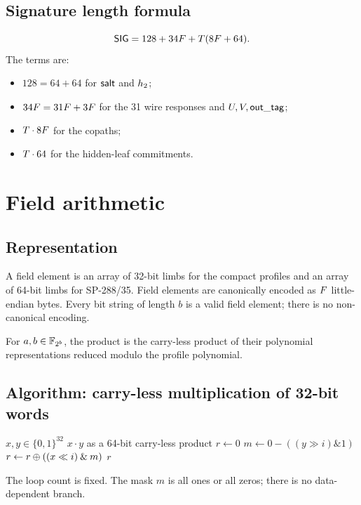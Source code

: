\documentclass[11pt,a4paper]{article}
\begin{document}
\subsection{Signature length formula}

\begin{equation}
\mathsf{SIG}=128+34F+T(8F+64).
\label{eq:siglen}
\end{equation}
The terms are:
\begin{itemize}
  \item $128=64+64$ for $\mathsf{salt}$ and $h_2$;
  \item $34F=31F+3F$ for the 31 wire responses and
        $U,V,\mathsf{out\_tag}$;
  \item $T\cdot8F$ for the copaths;
  \item $T\cdot64$ for the hidden-leaf commitments.
\end{itemize}

\section{Field arithmetic}

\subsection{Representation}

A field element is an array of 32-bit limbs for the compact profiles and an
array of 64-bit limbs for SP-288/35. Field elements are canonically encoded as
$F$ little-endian bytes. Every bit string of length $b$ is a valid field
element; there is no non-canonical encoding.

\begin{definition}
For $a,b\in\mathbb{F}_{2^{b}}$, the product is the carry-less product of their polynomial
representations reduced modulo the profile polynomial.
\end{definition}

\subsection{Algorithm: carry-less multiplication of 32-bit words}

\begin{algorithm}[ht]
\caption{$\mathsf{clmul32}(x,y)$}
\label{alg:clmul}
\begin{algorithmic}[1]
\REQUIRE $x,y\in\{0,1\}^{32}$
\ENSURE $x\cdot y$ as a 64-bit carry-less product
\STATE $r\gets0$
  \STATE $m\gets0-( (y\gg i)\mathbin{\&}1)$
  \STATE $r\gets r\oplus((x\ll i)\mathbin{\&}m)$
\ENDFOR
\RETURN $r$
\end{algorithmic}
\end{algorithm}
The loop count is fixed. The mask $m$ is all ones or all zeros; there is no
data-dependent branch.
\end{document}
